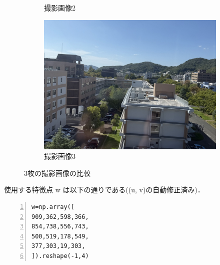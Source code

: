 \documentclass[autodetect-engine,dvi=dvipdfmx,ja=standard,
               a4j,11pt]{bxjsarticle}
\begin{document}
\begin{figure}[h]
\begin{subfigure}[b]{0.3\textwidth}
    \caption{撮影画像2}
    \label{fig:IMG_5565.jpg}
  \end{subfigure}
  \hfill
  \begin{subfigure}[b]{0.3\textwidth}
    \centering
    \includegraphics[width=\textwidth]{IMG_5566.jpg}
    \caption{撮影画像3}
    \label{fig:IMG_5566.jpg}
  \end{subfigure}
  \caption{3枚の撮影画像の比較}
  \label{fig:photo_comparison}
\end{figure}

使用する特徴点 w は以下の通りである((u, v)の自動修正済み)．
\begin{Verbatim}[numbers=left, xleftmargin=10mm, numbersep=6pt,
                    fontsize=\small, baselinestretch=0.8]
  w=np.array([
909,362,598,366,
854,738,556,743,
500,519,178,549,
377,303,19,303,
]).reshape(-1,4)
\end{Verbatim}
\end{document}
